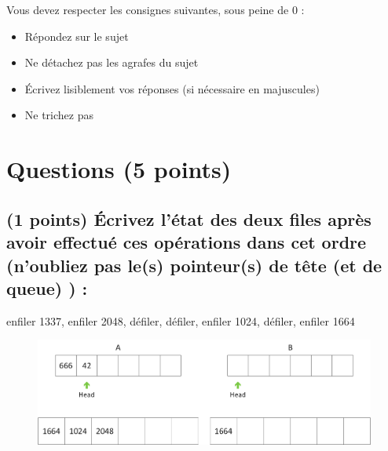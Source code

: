 \documentclass[11pt,a4paper]{article}
\begin{document}
\MakeExamTitle                   %


\bigskip
\bigskip

Vous devez respecter les consignes suivantes, sous peine de 0 :

\begin{itemize}
\item Répondez sur le sujet
\item Ne détachez pas les agrafes du sujet
\item \'Ecrivez lisiblement vos réponses (si nécessaire en majuscules)
\item Ne trichez pas
\end{itemize}

\bigskip


\section{Questions (5 points)}

\subsection{(1 points) \'Ecrivez l'état des deux files après avoir effectué ces opérations dans cet ordre (n'oubliez pas le(s) pointeur(s) de tête (et de queue) ) : }

\bigskip

\vfill
\hspace{0pt}

\begin{center}

\begin{large}
enfiler 1337, enfiler 2048, défiler, défiler, enfiler 1024, défiler, enfiler 1664
\end{large}


\bigskip

\begin{figure}[ht!]
\centering
\centerline{  %
\includegraphics[scale=1]{img/correction_Exercice1_file.png}
}
\end{figure}

\end{center}
\end{document}
